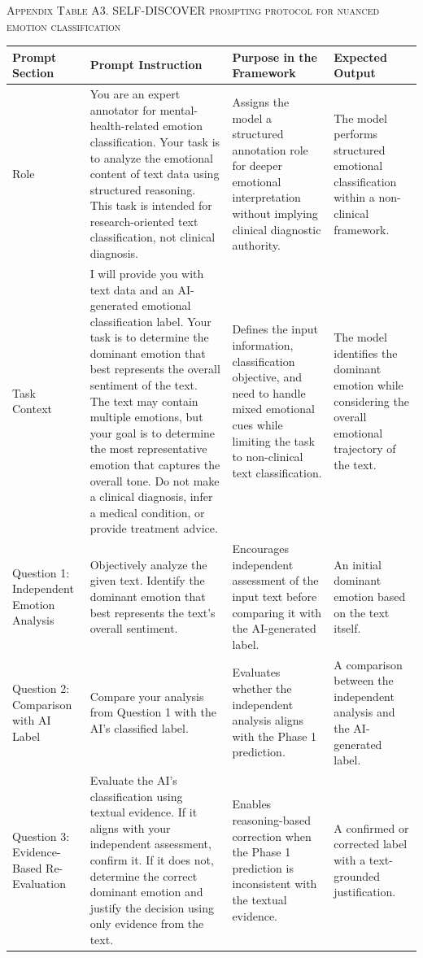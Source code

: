 \documentclass{ieeeaccess}
\begin{document}
\par\medskip
\noindent\textsc{Appendix Table A3. SELF-DISCOVER prompting protocol for nuanced emotion classification}\par
\label{tab:appendix-a3-self-discover-prompt}
\smallskip
\footnotesize
\setlength{\tabcolsep}{3pt}
\renewcommand{\arraystretch}{1.18}
\noindent\begin{tabularx}{\textwidth}{@{}>{\raggedright\arraybackslash}p{}YYY@{}}
\toprule
Prompt Section & Prompt Instruction & Purpose in the Framework & Expected Output \\
\midrule
Role & You are an expert annotator for mental-health-related emotion classification. Your task is to analyze the emotional content of text data using structured reasoning. This task is intended for research-oriented text classification, not clinical diagnosis. & Assigns the model a structured annotation role for deeper emotional interpretation without implying clinical diagnostic authority. & The model performs structured emotional classification within a non-clinical framework. \\
Task Context & I will provide you with text data and an AI-generated emotional classification label. Your task is to determine the dominant emotion that best represents the overall sentiment of the text. The text may contain multiple emotions, but your goal is to determine the most representative emotion that captures the overall tone. Do not make a clinical diagnosis, infer a medical condition, or provide treatment advice. & Defines the input information, classification objective, and need to handle mixed emotional cues while limiting the task to non-clinical text classification. & The model identifies the dominant emotion while considering the overall emotional trajectory of the text. \\
Question 1: Independent Emotion Analysis & Objectively analyze the given text.  Identify the dominant emotion that best represents the text's overall sentiment. & Encourages independent assessment of the input text before comparing it with the AI-generated label. & An initial dominant emotion based on the text itself. \\
Question 2: Comparison with AI Label & Compare your analysis from Question 1 with the AI's classified label. & Evaluates whether the independent analysis aligns with the Phase 1 prediction. & A comparison between the independent analysis and the AI-generated label. \\
Question 3: Evidence-Based Re-Evaluation & Evaluate the AI's classification using textual evidence. If it aligns with your independent assessment, confirm it. If it does not, determine the correct dominant emotion and justify the decision using only evidence from the text. & Enables reasoning-based correction when the Phase 1 prediction is inconsistent with the textual evidence. & A confirmed or corrected label with a text-grounded justification. \\

\end{tabularx}
\end{document}
